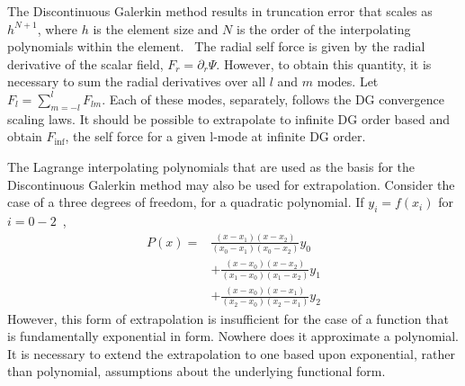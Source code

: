 The Discontinuous Galerkin method results in truncation error that scales as $h^{N+1}$, where $h$ is the element size and $N$ is the order of the interpolating polynomials within the element.~\cite{dghesthaven} The radial self force is given by the radial derivative of the scalar field, $F_r=\partial_r\Psi$. However, to obtain this quantity, it is necessary to sum the radial derivatives over all $l$ and $m$ modes. Let $F_l=\sum_{m=-l}^l F_{lm}$. Each of these modes, separately, follows the DG convergence scaling laws. It should be possible to extrapolate to infinite DG order based and obtain $F_{\inf}$, the self force for a given l-mode at infinite DG order.

The Lagrange interpolating polynomials that are used as the basis for the Discontinuous Galerkin method may also be used for extrapolation. Consider the case of a three degrees of freedom, for a quadratic polynomial. If $y_i=f(x_i)$ for $i=0-2$~\cite{NRinC++},
\begin{eqnarray}
P(x)=&\frac{(x-x_1)(x-x_2)}{(x_0-x_1)(x_0-x_2)}y_0\nonumber\\
&+\frac{(x-x_0)(x-x_2)}{(x_1-x_0)(x_1-x_2)}y_1\nonumber\\
&+\frac{(x-x_0)(x-x_1)}{(x_2-x_0)(x_2-x_1)}y_2
\end{eqnarray}
However, this form of extrapolation is insufficient for the case of a function that is fundamentally exponential in form. Nowhere does it approximate a polynomial. It is necessary to extend the extrapolation to one based upon exponential, rather than polynomial, assumptions about the underlying functional form.

